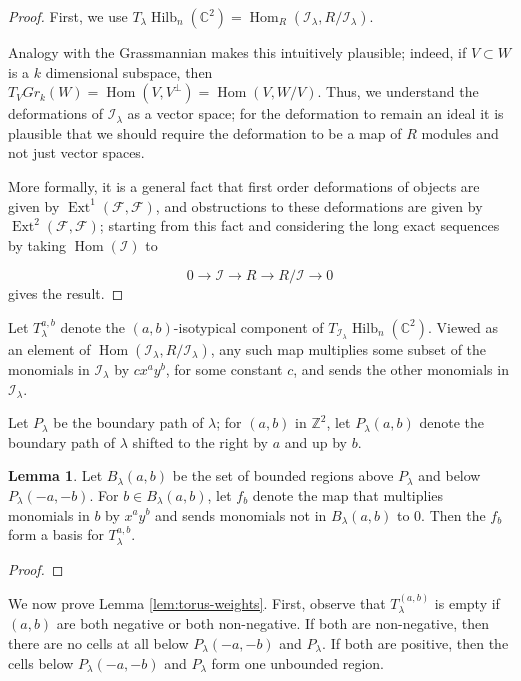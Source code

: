 \documentclass{amsart}[12pt]
\theoremstyle{definition}
\newtheorem{lemma}[dummy]{Lemma}
\newcommand{\Z}{\mathbb{Z}}
\newcommand{\C}{\mathbb{C}}
\DeclareMathOperator{\Hilb}{Hilb}
\DeclareMathOperator{\Ext}{Ext}
\DeclareMathOperator{\Hom}{Hom}
\begin{document}
\begin{proof}



First, we use $T_\lambda\Hilb_n(\C^2)=\Hom_R(\mathcal{I}_\lambda,R/\mathcal{I}_\lambda)$.

Analogy with the Grassmannian makes this intuitively plausible; indeed, if $V\subset W$ is a $k$ dimensional subspace, then $T_V Gr_k(W)=\Hom(V, V^\perp)=\Hom(V, W/V)$.  Thus, we understand the deformations of $\mathcal{I}_\lambda$ as a vector space; for the deformation to remain an ideal it is plausible that we should require the deformation to be a map of $R$ modules and not just vector spaces.

More formally, it is a general fact that first order deformations of objects are given by $\Ext^1(\mathcal{F},\mathcal{F})$, and obstructions to these deformations are given by $\Ext^2(\mathcal{F},\mathcal{F})$; starting from this fact and considering the long exact sequences by taking $\Hom(\mathcal{I})$ to

$$0\to \mathcal{I}\to R\to R/\mathcal{I}\to 0$$
gives the result.

\end{proof}


Let $T_\lambda^{a,b}$ denote the $(a,b)$-isotypical component of $T_{\mathcal{I}_\lambda}\Hilb_n(\C^2)$.  Viewed as an element of $\Hom(\mathcal{I}_\lambda, R/\mathcal{I}_\lambda)$, any such map multiplies some subset of the monomials in $\mathcal{I}_\lambda$ by $cx^a y^b$, for some constant $c$, and sends the other monomials in $\mathcal{I}_\lambda$.  

Let $P_\lambda$ be the boundary path of $\lambda$; for $(a,b)$ in $\Z^2$, let $P_\lambda(a,b)$ denote the boundary path of $\lambda$ shifted to the right by $a$ and up by $b$.

\begin{lemma} Let $B_\lambda(a,b)$ be the set of bounded regions above $P_\lambda$ and below $P_\lambda(-a,-b)$.  For $b\in B_\lambda(a,b)$, let $f_b$ denote the map that multiplies monomials in $b$ by $x^ay^b$ and sends monomials not in $B_\lambda(a,b)$ to $0$.  Then the $f_b$ form a basis for $T_\lambda^{a,b}$.
\end{lemma}

\begin{proof}


\end{proof}


We now prove Lemma \ref{lem:torus-weights}.  First, observe that $T_\lambda^{(a,b)}$ is empty if $(a,b)$ are both negative or both non-negative.  If both are non-negative, then there are no cells at all below $P_\lambda(-a,-b)$ and $P_\lambda$.  If both are positive, then the cells below $P_\lambda(-a,-b)$ and $P_\lambda$ form one unbounded region.  
\end{document}
